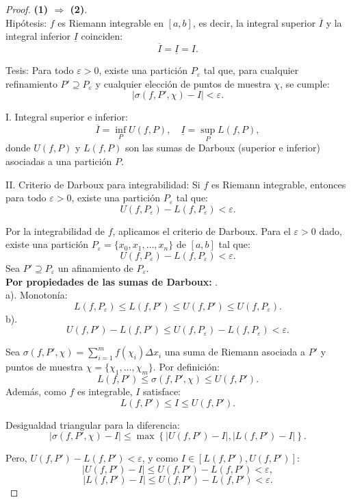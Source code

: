 \documentclass{article}
\begin{document}
	\begin{proof}\textbf{(1) \(\Rightarrow\) (2)}.\\
	Hipótesis:
	\( f \) es Riemann integrable en \([a, b]\), es decir, la integral superior \( \overline{I} \) y la integral inferior \( \underline{I} \) coinciden:  
	\[
	\overline{I} = \underline{I} = I.
	\]
	
	Tesis:  
	Para todo \( \varepsilon > 0 \), existe una partición \( P_\varepsilon \) tal que, para cualquier refinamiento \( P' \supseteq P_\varepsilon \) y cualquier elección de puntos de muestra \( \chi \), se cumple:  
	\[
	|\sigma(f, P', \chi) - I| < \varepsilon.
	\]
	
	I. Integral superior e inferior:
	\[
	\overline{I} = \inf_{P} U(f, P), \quad \underline{I} = \sup_{P} L(f, P),
	\]  
	donde \( U(f, P) \) y \( L(f, P) \) son las sumas de Darboux (superior e inferior) asociadas a una partición \( P \).
	
	II. Criterio de Darboux para integrabilidad: 
	Si \( f \) es Riemann integrable, entonces para todo \( \varepsilon > 0 \), existe una partición \( P_\varepsilon \) tal que:  
	\[
	U(f, P_\varepsilon) - L(f, P_\varepsilon) < \varepsilon.
	\]
	
	Por la integrabilidad de \( f \), aplicamos el criterio de Darboux. Para el \( \varepsilon > 0 \) dado, existe una partición \( P_\varepsilon = \{x_0, x_1, \ldots, x_n\} \) de \([a, b]\) tal que:  
	\[
	U(f, P_\varepsilon) - L(f, P_\varepsilon) < \varepsilon.
	\]
	Sea \( P' \supseteq P_\varepsilon \) un afinamiento de \( P_\varepsilon \).\\ 
	\textbf{Por propiedades de las sumas de Darboux:}  .\\
	a). Monotonía:
	\[
	L(f, P_\varepsilon) \leq L(f, P') \leq U(f, P') \leq U(f, P_\varepsilon).
	\]  
	b). 
	\[
	U(f, P') - L(f, P') \leq U(f, P_\varepsilon) - L(f, P_\varepsilon) < \varepsilon.
	\]
	
	Sea \( \sigma(f, P', \chi) = \sum_{i=1}^m f(\chi_i) \Delta x_i \) una suma de Riemann asociada a \( P' \) y puntos de muestra \( \chi = \{\chi_1, \ldots, \chi_m\} \). Por definición:  
	\[
	L(f, P') \leq \sigma(f, P', \chi) \leq U(f, P').
	\]  
	Además, como \( f \) es integrable, \( I \) satisface:  
	\[
	L(f, P') \leq I \leq U(f, P').
	\]  
	
	Desigualdad triangular para la diferencia:  
	\[
	|\sigma(f, P', \chi) - I| \leq \max\left\{ |U(f, P') - I|, |L(f, P') - I| \right\}.
	\]  
	
	Pero, \( U(f, P') - L(f, P') < \varepsilon \), y como \( I \in [L(f, P'), U(f, P')] \):  
	\[
	|U(f, P') - I| \leq U(f, P') - L(f, P') < \varepsilon,
	\]  
	\[
	|L(f, P') - I| \leq U(f, P') - L(f, P') < \varepsilon.
	\]  
	

\end{proof}
\end{document}
